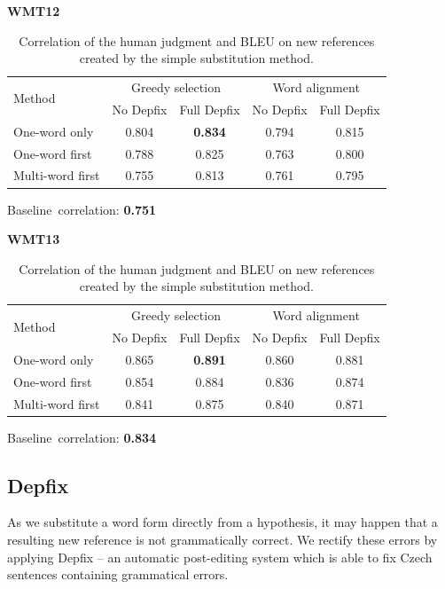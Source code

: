 \documentclass[11pt]{article}
\begin{document}
\begin{table}[tb]
\begin{center}

\textbf{WMT12}\\
\begin{tabular}{l|cc|cc}
\hline
\multirow{2}{*}{Method} & \multicolumn{2}{c|}{Greedy selection} & \multicolumn{2}{c}{Word alignment} \\
& No Depfix & Full Depfix  & No Depfix & Full Depfix \\
\hline
One-word only     & 0.804 & \textbf{0.834} & 0.794 & 0.815 \\
One-word first    & 0.788 & 0.825 & 0.763 & 0.800  \\
Multi-word first  & 0.755 & 0.813 & 0.761 & 0.795  \\
\end{tabular}

\vspace{10pt}
Baseline~correlation: \textbf{0.751}
\vspace{10pt}

\textbf{WMT13}\\
\begin{tabular}{l|cc|cc}
\hline
\multirow{2}{*}{Method} & \multicolumn{2}{c|}{Greedy selection} & \multicolumn{2}{c}{Word alignment} \\
& No Depfix & Full Depfix  & No Depfix & Full Depfix \\
\hline
One-word only     & 0.865 & \textbf{0.891} & 0.860 & 0.881  \\
One-word first    & 0.854 & 0.884  & 0.836 & 0.874 \\
Multi-word first  & 0.841 & 0.875  & 0.840 & 0.871  \\
\end{tabular}

\vspace{10pt}
Baseline~correlation: \textbf{0.834}
\caption{Correlation of the human judgment and BLEU on new references created
by the simple substitution method.}
\label{lrec_results}
\end{center}
\end{table}

\subsection{Depfix}
As we substitute a word form directly from a hypothesis, it may happen that a 
resulting new reference is not grammatically correct. We rectify these errors 
by applying Depfix \cite{depfix} -- an automatic post-editing system which is 
able to fix Czech sentences containing grammatical errors.
\end{document}
